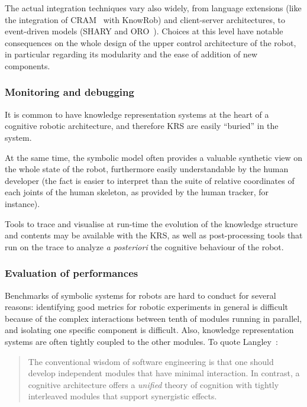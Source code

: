 The actual integration techniques vary also widely, from language extensions
(like the integration of CRAM~\cite{Beetz2010} with KnowRob) and client-server
architectures, to event-driven models (SHARY and ORO~\cite{Alami2011}). Choices
at this level have notable consequences on the whole design of the upper
control architecture of the robot, in particular regarding its modularity and
the ease of addition of new components.

\subsubsection{Monitoring and debugging}
\label{sect|debugging}

It is common to have knowledge representation systems at the heart of a
cognitive robotic architecture, and therefore KRS are easily ``buried'' in the
system.

At the same time, the symbolic model often provides a valuable synthetic view
on the whole state of the robot, furthermore easily understandable by the human
developer (the fact  is easier to interpret than
the suite of relative coordinates of each joints of the human skeleton, as
provided by the human tracker, for instance).

Tools to trace and visualise at run-time the evolution of the knowledge
structure and contents may be available with the KRS, as well as
post-processing tools that run on the trace to analyze {\it a posteriori} the
cognitive behaviour of the robot.

\subsubsection{Evaluation of performances}
\label{sect|performances}

Benchmarks of symbolic systems for robots are hard to conduct for several
reasons: identifying good metrics for robotic experiments in general is
difficult because of the complex interactions between tenth of modules running
in parallel, and isolating one specific component is difficult.  Also,
knowledge representation systems are often tightly coupled to the other
modules. To quote Langley~\cite{Langley2006}:

\begin{quote}
The conventional wisdom of software engineering is that one should
develop independent modules that have minimal interaction. In contrast, a
cognitive architecture offers a \emph{unified} theory of cognition with tightly
interleaved modules that support synergistic effects.
\end{quote}

